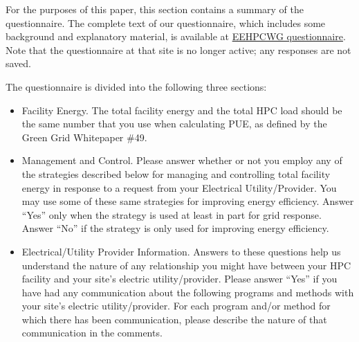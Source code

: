 For the purposes of this paper, this section contains a summary of the questionnaire.
The complete text of our questionnaire, which includes some background 
and explanatory material, is available at
\href{https://www.surveymonkey.com/s.aspx?sm=Y%2feFYAHaRP1tw5bhUMdtfg%3d%3d}{EEHPCWG questionnaire}.
Note that the questionnaire at that site is no longer active; any responses are not saved.

The questionnaire is divided into the following three sections: 
\begin{itemize}

\item
Facility Energy. The total facility energy and the total HPC load should be the 
same number that you use when 
calculating PUE, as defined by the Green Grid Whitepaper \#49.

\item
Management and Control. 
Please answer whether or not you employ any of the strategies described below for managing 
and controlling total facility energy in response to a request from your Electrical Utility/Provider.
You may use some of these same strategies for improving energy efficiency. 
Answer ``Yes'' only when the strategy is used at least in part for grid response. 
Answer ``No'' if the strategy is only used for improving energy efficiency.

\item
Electrical/Utility Provider Information.
Answers to these questions help us understand the nature of any relationship you might have 
between your HPC facility and your site's electric utility/provider.
Please answer ``Yes'' if you have had any communication about the following programs and 
methods with your site's electric utility/provider.
For each program and/or method for which there has been communication, please describe 
the nature of that communication in the comments.
\end{itemize}

